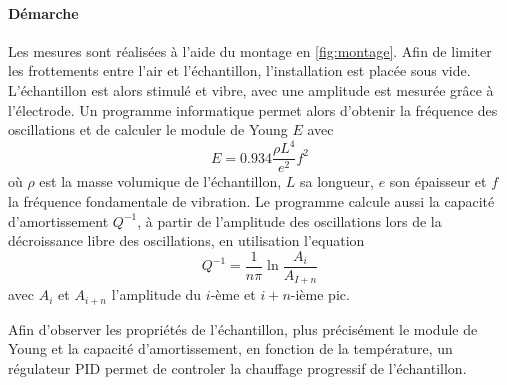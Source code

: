 \paragraph{Démarche} Les mesures sont réalisées à l'aide du montage en \autoref{fig:montage}. Afin de limiter les frottements entre l'air et l'échantillon, l'installation est placée sous vide. L'échantillon est alors stimulé et vibre, avec une amplitude est mesurée grâce à l'électrode. Un programme informatique permet alors d'obtenir la fréquence des oscillations et de calculer le module de Young \(E\) avec
\begin{equation}
    E = 0.934 \frac{\rho L^4}{e^2}f^2
    \label{eq:young_programme}
\end{equation}
où \(\rho\) est la masse volumique de l'échantillon, \(L\) sa longueur, \(e\) son épaisseur et \(f\) la fréquence fondamentale de vibration. Le programme calcule aussi la capacité d'amortissement \(Q^{-1}\), à partir de l'amplitude des oscillations lors de la décroissance libre des oscillations, en utilisation l'equation
\begin{equation}
    Q^{-1} = \frac{1}{n \pi} \ln \frac{A_i}{A_{I+n}}
    \label{eq:q1_programme}
\end{equation}
avec \(A_i\) et \(A_{i+n}\) l'amplitude du \(i\)-ème et \(i+n\)-ième pic.

Afin d'observer les propriétés de l'échantillon, plus précisément le module de Young et la capacité d'amortissement, en fonction de la température, un régulateur PID permet de controler la chauffage progressif de l'échantillon.
